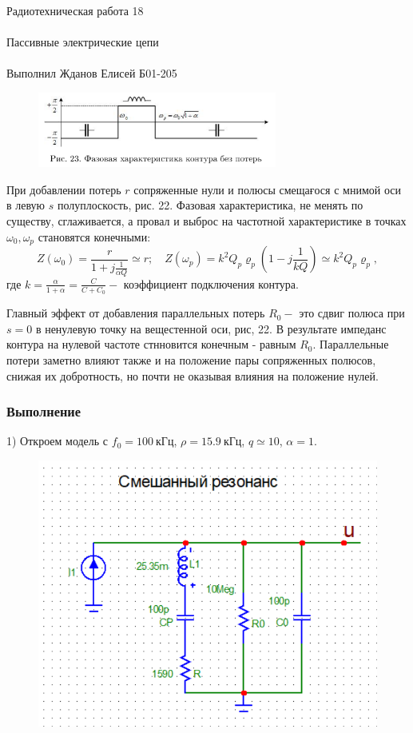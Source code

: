 \documentclass{astroedu-lab}
\begin{document}
\begin{problem}{\huge Радиотехническая работа 18\\\\Пассивные электрические цепи\\\\Выполнил Жданов Елисей Б01-205}
\begin{figure}[!h]
	\centering
	\includegraphics[width=0.7\textwidth]{6_2.png}
	\label{fig:boiler}
\end{figure}

При добавлении потерь $r$ сопряженные нули и полюсы смещағося с мнимой оси в левую $s$ полуплоскость, рис. 22. Фазовая характеристика, не менять по существу, сглаживается, а провал и выброс на частотной характеристике в точках $\omega_0, \omega_p$ становятся конечными:
$$
Z\left(\omega_0\right)=\frac{r}{1+j \frac{1}{\alpha Q}} \simeq r ; \quad Z\left(\omega_p\right)=k^2 Q_p \varrho_p\left(1-j \frac{1}{k Q}\right) \simeq k^2 Q_p \varrho_p,
$$
где $k=\frac{\alpha}{1+\alpha}=\frac{C}{C+C_0}-$ коэффициент подключения контура.

Главный эффект от добавления параллельных потерь $R_0-$ это сдвиг полюса при $s=0$ в ненулевую точку на вещестенной оси, рис, 22. В результате импеданс контура на нулевой частоте стнновится конечным - равным $R_0$. Параллельные потери заметно влияют также и на положение пары сопряженных полюсов, снижая их добротность, но почти не оказывая влияния на положение нулей.

\subsubsection{Выполнение}

1) Откроем модель  с $f_0 = 100 \: \text{кГц}$, $\rho = 15.9 \: \text{кГц}$, $q \simeq 10$, $\alpha = 1$.

\begin{figure}[h!]
\centering
\includegraphics[scale=1]{combined_img.png}
\label{fig:Image1}
\end{figure}


\end{problem}
\end{document}
